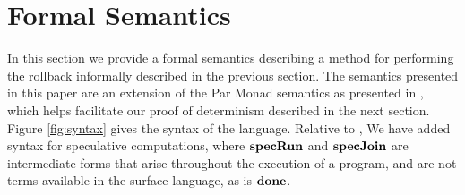 
\section{Formal Semantics}
In this section we provide a formal semantics describing a method for performing the rollback informally described in the previous section.  The semantics presented in this paper are an extension of the Par Monad semantics as presented in \cite{par-monad}, which helps facilitate our proof of determinism described in the next section. Figure \ref{fig:syntax} gives the syntax of the language.  Relative to \cite{par-monad}, We have added syntax for speculative computations, where $\text{\bf specRun}$ and $\text{\bf specJoin}$ are intermediate forms that arise throughout the execution of a program, and are not terms available in the surface language, as is $\text{\bf done}$.  

